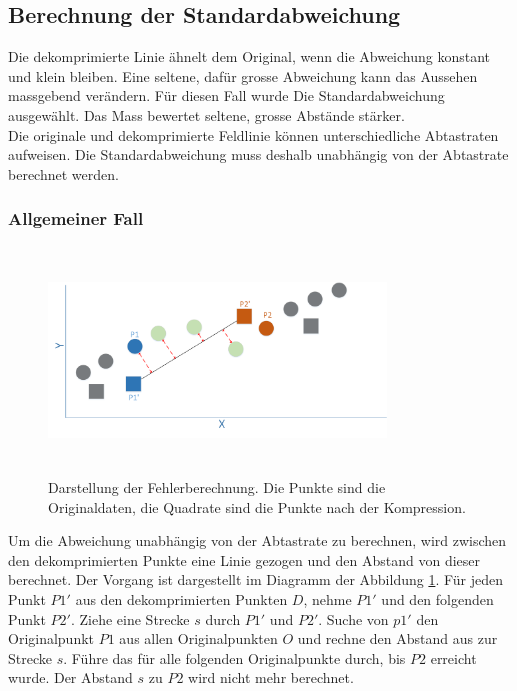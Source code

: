 \subsection{Berechnung der Standardabweichung}\label{testsetup:ablauf}
Die dekomprimierte Linie ähnelt dem Original, wenn die Abweichung konstant und klein bleiben. Eine seltene, dafür grosse Abweichung kann das Aussehen massgebend verändern. Für diesen Fall wurde Die Standardabweichung ausgewählt. Das Mass bewertet seltene, grosse Abstände stärker.\\
Die originale und dekomprimierte Feldlinie können unterschiedliche Abtastraten aufweisen. Die Standardabweichung muss deshalb unabhängig von der Abtastrate berechnet werden.

\subsubsection{Allgemeiner Fall}
\begin{figure}[!htbp]
	\center
	\includegraphics[width=0.8\textwidth,height=6cm,keepaspectratio]{./pictures/testsetup/errorcalc.png}
	\caption{Darstellung der Fehlerberechnung. Die Punkte sind die Originaldaten, die Quadrate sind die Punkte nach der Kompression.}
	\label{testsetup:ablauf:fehlerberechnung:diagramm}
\end{figure} 
Um die Abweichung unabhängig von der Abtastrate zu berechnen, wird zwischen den dekomprimierten Punkte eine Linie gezogen und den Abstand von dieser berechnet. Der Vorgang ist dargestellt im Diagramm der Abbildung \ref{testsetup:ablauf:fehlerberechnung:diagramm}. Für jeden Punkt $P1'$ aus den dekomprimierten Punkten $D$, nehme $P1'$ und den folgenden Punkt $P2'$. Ziehe eine Strecke $s$ durch $P1'$ und $P2'$. Suche von $p1'$ den Originalpunkt $P1$ aus allen Originalpunkten $O$ und rechne den Abstand aus zur Strecke $s$. Führe das für alle folgenden Originalpunkte durch, bis $P2$ erreicht wurde. Der Abstand $s$ zu $P2$ wird nicht mehr berechnet.\\
